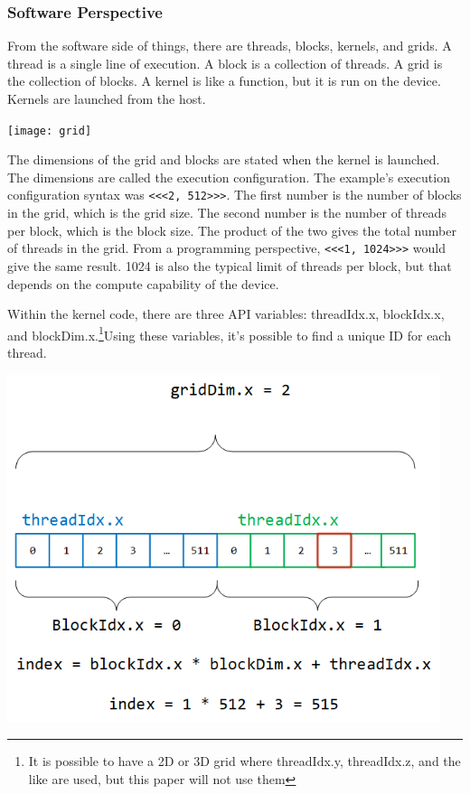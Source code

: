 \subsubsection{Software Perspective}
\indent From the software side of things, there are threads, blocks, kernels, and grids. A thread is a single line of execution. A block is a collection of threads. A grid is the collection of blocks. A kernel is like a function, but it is run on the device. Kernels are launched from the host.

\texttt{[image: grid]}

The dimensions of the grid and blocks are stated when the kernel is launched. The dimensions are called the \gls{execution configuration}. The example's execution configuration syntax was \verb|<<<2, 512>>>|. The first number is the number of blocks in the grid, which is the grid size. The second number is the number of threads per block, which is the block size. The product of the two gives the total number of threads in the grid. From a programming perspective, \verb|<<<1, 1024>>>| would give the same result. 1024 is also the typical limit of threads per block, but that depends on the compute capability of the device.

Within the kernel code, there are three API variables: threadIdx.x, blockIdx.x, and blockDim.x.\footnote{It is possible to have a 2D or 3D grid where threadIdx.y, threadIdx.z, and the like are used, but this paper will not use them}Using these variables, it's possible to find a unique ID for each thread. 

\includegraphics[width=0.95\textwidth]{img/cuda_indexing} 

